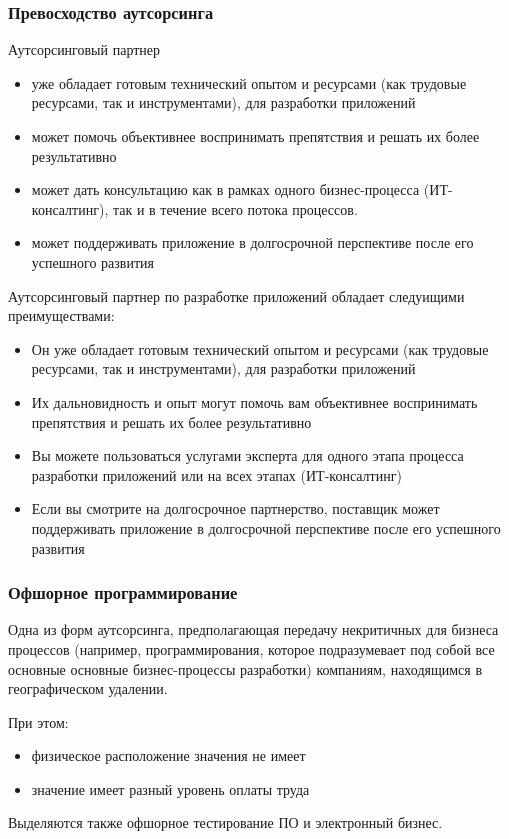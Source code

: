 \documentclass{../industrial-development}
\begin{document}
\begin{frame} \frametitle{Превосходство аутсорсинга}
Аутсорсинговый партнер
\begin{itemize}
		\item уже обладает готовым технический опытом и ресурсами (как трудовые ресурсами, так и инструментами), для разработки приложений
		\item может помочь объективнее воспринимать препятствия и решать их более результативно
		\item может дать консультацию как в рамках одного бизнес-процесса (\alert{ИТ-консалтинг}), так и в течение всего потока процессов.  
		\item может поддерживать приложение в долгосрочной перспективе после его успешного развития
\end{itemize}
\end{frame}
\lecturenotes
Аутсорсинговый партнер по разработке приложений обладает следуищими преимуществами:
\begin{itemize}
	\item Он уже обладает готовым технический опытом и ресурсами (как трудовые ресурсами, так и инструментами), для разработки приложений
	\item Их дальновидность и опыт могут помочь вам объективнее воспринимать препятствия и решать их более результативно
	\item Вы можете пользоваться услугами эксперта для одного этапа процесса разработки приложений или на всех этапах (ИТ-консалтинг)
	\item Если вы смотрите на долгосрочное партнерство, поставщик может поддерживать приложение в долгосрочной перспективе после его успешного развития~\cite[с.~45--54]{Аникин}
\end{itemize}


\begin{frame} \frametitle{Офшорное программирование}
\begin{block}{}
Одна из форм аутсорсинга, предполагающая передачу некритичных для бизнеса процессов (например, \alert{программирования}, которое подразумевает под собой все основные основные бизнес-процессы разработки) компаниям, находящимся в географическом удалении.
\end{block}
При этом:
\begin{itemize}
	\item физическое расположение значения \alert{не имеет}
	\item значение имеет \alert{разный уровень оплаты труда}
\end{itemize}
Выделяются также офшорное тестирование ПО и электронный бизнес.
\end{frame}
\end{document}
